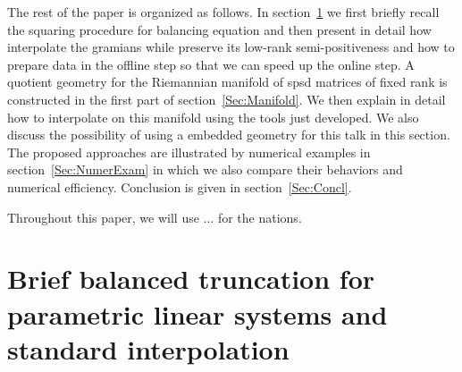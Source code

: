 The rest of the paper is organized as follows. In section~\ref{Sec:BT_standard interpolation} we first briefly recall the squaring procedure for balancing equation and then present in detail how interpolate the gramians while preserve its low-rank semi-positiveness and how to prepare data in the offline step so that we can speed up the online step. A quotient geometry for the Riemannian manifold of spsd matrices of fixed rank is constructed in the first part of section~\ref{Sec:Manifold}. We then explain in detail how to interpolate on this manifold using the tools just developed. We also discuss the possibility of using a embedded geometry  for this talk in this section. The proposed approaches are illustrated by numerical examples in section~\ref{Sec:NumerExam} in which we also compare their behaviors and numerical efficiency. Conclusion is given in section~\ref{Sec:Concl}. 

Throughout this paper, we will use ... for the nations.





\section{Brief balanced truncation for parametric linear systems and standard interpolation}\label{Sec:BT_standard interpolation}
